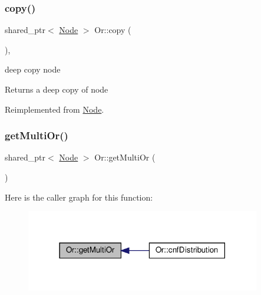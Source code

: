 \subsubsection{\texorpdfstring{copy()}{copy()}}
{\footnotesize\ttfamily shared\+\_\+ptr$<$ \hyperlink{class_node}{Node} $>$ Or\+::copy (\begin{DoxyParamCaption}{ }\end{DoxyParamCaption})\hspace{0.3cm}{\ttfamily [override]}, {\ttfamily [virtual]}}



deep copy node 

\begin{DoxyReturn}{Returns}
a deep copy of node 
\end{DoxyReturn}


Reimplemented from \hyperlink{class_node_a0d22a418a622a24852610fd51910c5eb}{Node}.

\mbox{\label{class_or_a1d32e059bdc6ff80fb4798c90553e2cb}} 
\subsubsection{\texorpdfstring{get\+Multi\+Or()}{getMultiOr()}}
{\footnotesize\ttfamily shared\+\_\+ptr$<$ \hyperlink{class_node}{Node} $>$ Or\+::get\+Multi\+Or (\begin{DoxyParamCaption}{ }\end{DoxyParamCaption})\hspace{0.3cm}{\ttfamily [private]}}

Here is the caller graph for this function\+:
\nopagebreak
\begin{figure}[H]
\begin{center}
\leavevmode
\includegraphics[width=290pt]{d8/d1b/class_or_a1d32e059bdc6ff80fb4798c90553e2cb_icgraph}
\end{center}
\end{figure}
\mbox{\label{class_or_aeedae2f08d30d4e9dcae30916aa27c59}} 
